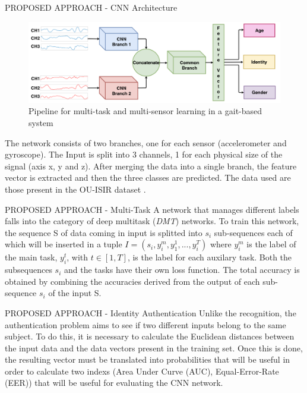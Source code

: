 \begin{frame}{PROPOSED APPROACH - CNN Architecture}
    \begin{figure}[htbp]
        \centering
        \includegraphics[width = 0.8 \linewidth]{images/paper5/architecture.png}
        \centering
        \caption{Pipeline for multi-task and multi-sensor learning in a gait-based system}
        \label{fig:pipeline}
    \end{figure}
    The network consists of two branches, one for each sensor (accelerometer 
    and gyroscope). The Input is split into 3 channels, 1 for each physical 
    size of the signal (axis x, y and z). After merging the data into a single 
    branch, the feature vector is extracted and then the three classes are 
    predicted. The data used are those present in the OU-ISIR dataset \small{}.
\end{frame}

\begin{frame}{PROPOSED APPROACH - Multi-Task}
    A network that manages different labels falls into the category of deep 
    multitask (\emph{DMT}) networks. To train this network, the sequence S of data 
    coming in input is splitted into $ s_i $ sub-sequences each of which will be 
    inserted in a tuple $ I = (s_i, y_i^m, y_1^1, ..., y_i^T) $ where $ y_i^m $ is the label of the 
    main task, $ y_i^t $, with $ t \in [1,T] $, is the label for each auxilary task. Both 
    the subsequences $ s_i $ and the tasks have their own loss function. The  total  
    accuracy  is  obtained  by combining the accuracies derived from the output 
    of each sub-sequence $ s_i $  of  the  input  S.
\end{frame}

\begin{frame}{PROPOSED APPROACH - Identity Authentication}
    Unlike the recognition, the authentication problem aims to see if 
    two different inputs belong to the same subject. To do this, it is necessary 
    to calculate the Euclidean distances between the input data and the data 
    vectors present in the training set. Once this is done, the resulting vector 
    must be translated into probabilities that will be useful in order to 
    calculate two indexs (Area Under Curve (AUC), Equal-Error-Rate 
    (EER)) that will be useful for evaluating the CNN network.
\end{frame}

